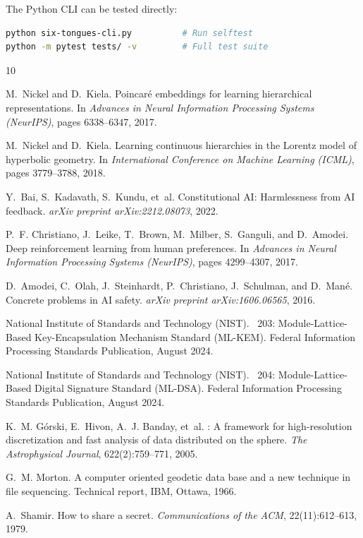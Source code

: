 \documentclass[11pt,a4paper]{article}
\begin{document}
\noindent The Python CLI can be tested directly:
\begin{lstlisting}[language=bash]
python six-tongues-cli.py          # Run selftest
python -m pytest tests/ -v         # Full test suite
\end{lstlisting}


\begin{thebibliography}{10}

M.~Nickel and D.~Kiela.
\newblock Poincar\'{e} embeddings for learning hierarchical representations.
\newblock In \emph{Advances in Neural Information Processing Systems (NeurIPS)},
  pages 6338--6347, 2017.

M.~Nickel and D.~Kiela.
\newblock Learning continuous hierarchies in the {L}orentz model of hyperbolic
  geometry.
\newblock In \emph{International Conference on Machine Learning (ICML)},
  pages 3779--3788, 2018.

Y.~Bai, S.~Kadavath, S.~Kundu, et~al.
\newblock Constitutional {AI}: Harmlessness from {AI} feedback.
\newblock \emph{arXiv preprint arXiv:2212.08073}, 2022.

P.~F. Christiano, J.~Leike, T.~Brown, M.~Milber, S.~Ganguli, and D.~Amodei.
\newblock Deep reinforcement learning from human preferences.
\newblock In \emph{Advances in Neural Information Processing Systems (NeurIPS)},
  pages 4299--4307, 2017.

D.~Amodei, C.~Olah, J.~Steinhardt, P.~Christiano, J.~Schulman, and D.~Man\'{e}.
\newblock Concrete problems in {AI} safety.
\newblock \emph{arXiv preprint arXiv:1606.06565}, 2016.

{National Institute of Standards and Technology (NIST)}.
~203: Module-Lattice-Based Key-Encapsulation Mechanism Standard
  ({ML-KEM}).
\newblock Federal Information Processing Standards Publication, August 2024.

{National Institute of Standards and Technology (NIST)}.
~204: Module-Lattice-Based Digital Signature Standard ({ML-DSA}).
\newblock Federal Information Processing Standards Publication, August 2024.

K.~M. G\'{o}rski, E.~Hivon, A.~J. Banday, et~al.
: A framework for high-resolution discretization and fast
  analysis of data distributed on the sphere.
\newblock \emph{The Astrophysical Journal}, 622(2):759--771, 2005.

G.~M. Morton.
\newblock A computer oriented geodetic data base and a new technique in file
  sequencing.
\newblock Technical report, IBM, Ottawa, 1966.

A.~Shamir.
\newblock How to share a secret.
\newblock \emph{Communications of the ACM}, 22(11):612--613, 1979.

\end{thebibliography}
\end{document}
